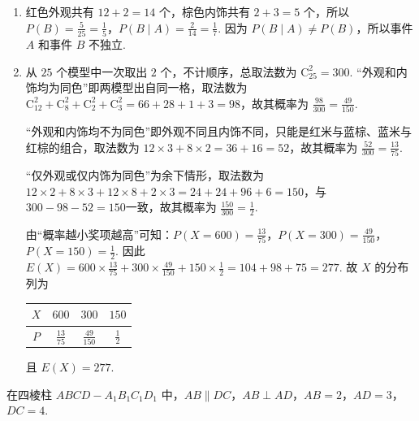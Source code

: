 \begin{solution}
\begin{enumerate}
\item 红色外观共有 \(12+2=14\) 个，棕色内饰共有 \(2+3=5\) 个，所以 \(P(B)=\frac{5}{25}=\frac15\)，\(P(B\mid A)=\frac{2}{14}=\frac17\).
因为 \(P(B\mid A)\ne P(B)\)，所以事件 \(A\) 和事件 \(B\) 不独立.

\item 从 \(25\) 个模型中一次取出 \(2\) 个，不计顺序，总取法数为 \(\mathrm C_{25}^{2}=300\).
“外观和内饰均为同色”即两模型出自同一格，取法数为 \(\mathrm C_{12}^{2}+\mathrm C_{8}^{2}+\mathrm C_{2}^{2}+\mathrm C_{3}^{2}=66+28+1+3=98\)，故其概率为 \(\frac{98}{300}=\frac{49}{150}\).

“外观和内饰均不为同色”即外观不同且内饰不同，只能是红米与蓝棕、蓝米与红棕的组合，取法数为 \(12\times 3+8\times 2=36+16=52\)，故其概率为 \(\frac{52}{300}=\frac{13}{75}\).

“仅外观或仅内饰为同色”为余下情形，取法数为 \(12\times 2+8\times 3+12\times 8+2\times 3=24+24+96+6=150\)，与 \(300-98-52=150\)一致，故其概率为 \(\frac{150}{300}=\frac12\).

由“概率越小奖项越高”可知：\(P(X=600)=\frac{13}{75}\)，\(P(X=300)=\frac{49}{150}\)，\(P(X=150)=\frac12\).
因此 \(E(X)=600\times \frac{13}{75}+300\times \frac{49}{150}+150\times \frac12=104+98+75=277\).
故 \(X\) 的分布列为
{\centering
\begin{tabular}{c|ccc}
\(X\) & \(600\) & \(300\) & \(150\) \\
\hline
\(P\) & \(\frac{13}{75}\) & \(\frac{49}{150}\) & \(\frac12\)
\end{tabular}
\par}
且 \(E(X)=277\).
\end{enumerate}
\end{solution}

\begin{problem}
在四棱柱 \(ABCD-A_1B_1C_1D_1\) 中，\(AB\parallel DC\)，\(AB\perp AD\)，\(AB=2\)，\(AD=3\)，\(DC=4\).

\end{problem}

